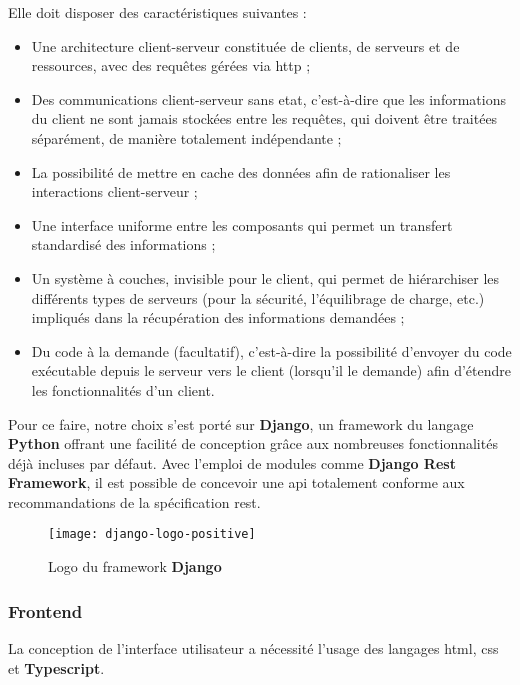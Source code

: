 Elle doit disposer des caractéristiques suivantes :

\begin{itemize}
  \item Une architecture client-serveur constituée de clients, de serveurs et de ressources, avec des requêtes gérées via \acrshort{http} ;
  \item Des communications client-serveur sans etat, c'est-à-dire que les informations du client ne sont jamais stockées entre les requêtes, 
  qui doivent être traitées séparément, de manière totalement indépendante ;
  \item La possibilité de mettre en cache des données afin de rationaliser les interactions client-serveur ;
  \item Une interface uniforme entre les composants qui permet un transfert standardisé des informations ;
  \item Un système à couches, invisible pour le client, qui permet de hiérarchiser les différents types de serveurs 
  (pour la sécurité, l'équilibrage de charge, etc.) impliqués dans la récupération des informations demandées ;
  \item Du code à la demande (facultatif), c'est-à-dire la possibilité d'envoyer du code exécutable depuis le serveur vers le client 
  (lorsqu'il le demande) afin d'étendre les fonctionnalités d'un client.\cite{redhat_rest_spec}
\end{itemize}

Pour ce faire, notre choix s’est porté sur \textbf{Django}, un framework du langage \textbf{Python} offrant une facilité de conception grâce aux nombreuses fonctionnalités déjà incluses par défaut. 
Avec l’emploi de modules comme \textbf{Django Rest Framework}, il est possible de concevoir une \acrshort{api} totalement conforme aux recommandations de la spécification \acrshort{rest}.

\begin{figure}[h]
  \centering
  \texttt{[image: django-logo-positive]}
  \caption{Logo du framework \textbf{Django}}
  \label{fig:django_logo}
\end{figure}


\subsubsection{Frontend}
La conception de l’interface utilisateur a nécessité l’usage des langages \acrshort{html}, \acrshort{css} et \textbf{Typescript}.

